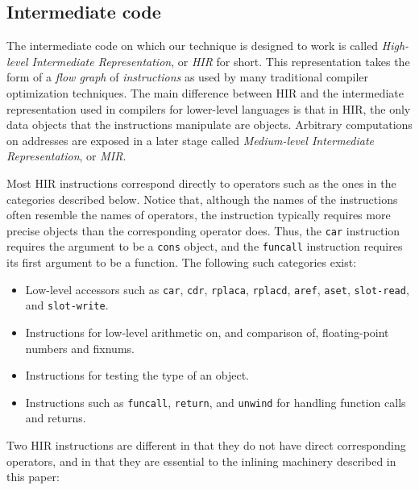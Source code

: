 \subsection{Intermediate code}

The intermediate code on which our technique is designed to work is
called \emph{High-level Intermediate Representation}, or \emph{HIR}
for short.  This representation takes the form of a \emph{flow graph}
of \emph{instructions} as used by many traditional compiler
optimization techniques.  The main difference between HIR and the
intermediate representation used in compilers for lower-level
languages is that in HIR, the only data objects that the instructions
manipulate are \commonlisp{} objects.  Arbitrary computations on
addresses are exposed in a later stage called \emph{Medium-level
  Intermediate Representation}, or \emph{MIR}.

Most HIR instructions correspond directly to \commonlisp{} operators
such as the ones in the categories described below.  Notice that,
although the names of the instructions often resemble the names of
\commonlisp{} operators, the instruction typically requires more
precise objects than the corresponding \commonlisp{} operator does.
Thus, the \texttt{car} instruction requires the argument to be a
\texttt{cons} object, and the \texttt{funcall} instruction requires its
first argument to be a function.  The following such categories exist:

\begin{itemize}
\item Low-level accessors such as \texttt{car}, \texttt{cdr},
  \texttt{rplaca}, \texttt{rplacd}, \texttt{aref}, \texttt{aset},
  \texttt{slot-read}, and \texttt{slot-write}.
\item Instructions for low-level arithmetic on, and comparison of,
  floating-point numbers and fixnums.
\item Instructions for testing the type of an object.
\item Instructions such as \texttt{funcall}, \texttt{return}, and
  \texttt{unwind} for handling function calls and returns.
\end{itemize}

Two HIR instructions are different in that they do not have direct
corresponding \commonlisp{} operators, and in that they are essential
to the inlining machinery described in this paper:


